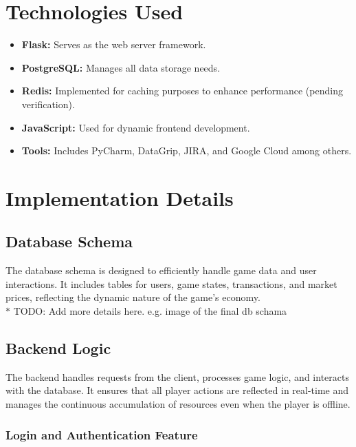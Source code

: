 \documentclass[12pt]{article}
\begin{document}
\section{Technologies Used}
\begin{itemize}
    \item \textbf{Flask:} Serves as the web server framework.
    \item \textbf{PostgreSQL:} Manages all data storage needs.
    \item \textbf{Redis:} Implemented for caching purposes to enhance performance (pending verification).
    \item \textbf{JavaScript:} Used for dynamic frontend development.
    \item \textbf{Tools:} Includes PyCharm, DataGrip, JIRA, and Google Cloud among others.
\end{itemize}

\section{Implementation Details}
\subsection{Database Schema}
The database schema is designed to efficiently handle game data and user interactions. It includes tables for users, game states, transactions, and market prices, reflecting the dynamic nature of the game's economy.
\\ $\ast$ TODO: Add more details here. e.g. image of the final db schama

\subsection{Backend Logic}
The backend handles requests from the client, processes game logic, and interacts with the database. It ensures that all player actions are reflected in real-time and manages the continuous accumulation of resources even when the player is offline.
\subsubsection{Login and Authentication Feature}
\end{document}

